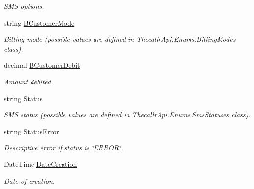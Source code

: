 \begin{DoxyCompactItemize}
\begin{DoxyCompactList}\small\item\em S\+M\+S options. \end{DoxyCompactList}\item 
string \hyperlink{class_thecallr_api_1_1_objects_1_1_sms_1_1_sms_ad83d4b652366ee9a27466298a0b96b1f}{B\+Customer\+Mode}
\begin{DoxyCompactList}\small\item\em Billing mode (possible values are defined in Thecallr\+Api.\+Enums.\+Billing\+Modes class). \end{DoxyCompactList}\item 
decimal \hyperlink{class_thecallr_api_1_1_objects_1_1_sms_1_1_sms_aa00199af3aa282597a789f6f80ff809d}{B\+Customer\+Debit}
\begin{DoxyCompactList}\small\item\em Amount debited. \end{DoxyCompactList}\item 
string \hyperlink{class_thecallr_api_1_1_objects_1_1_sms_1_1_sms_a5696eacf0b2b71e0e57ac1d5d8f4c5d5}{Status}
\begin{DoxyCompactList}\small\item\em S\+M\+S status (possible values are defined in Thecallr\+Api.\+Enums.\+Sms\+Statuses class). \end{DoxyCompactList}\item 
string \hyperlink{class_thecallr_api_1_1_objects_1_1_sms_1_1_sms_a86b7454de956bf5f0ffb7408acfe0451}{Status\+Error}
\begin{DoxyCompactList}\small\item\em Descriptive error if status is \char`\"{}\+E\+R\+R\+O\+R\char`\"{}. \end{DoxyCompactList}\item 
Date\+Time \hyperlink{class_thecallr_api_1_1_objects_1_1_sms_1_1_sms_aa5cd1ebfd79ee98aa22dbca23bb2b53f}{Date\+Creation}
\begin{DoxyCompactList}\small\item\em Date of creation. \end{DoxyCompactList}\item 

\end{DoxyCompactItemize}
